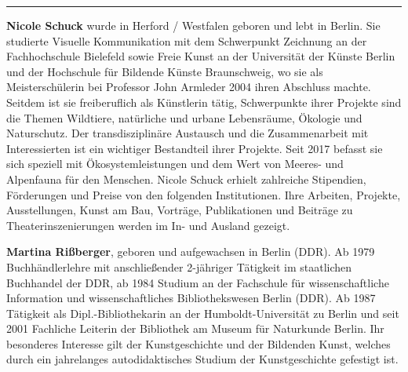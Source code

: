 \begin{center}\rule{0.5\linewidth}{0.5pt}\end{center}

\textbf{Nicole Schuck} wurde in Herford / Westfalen geboren und lebt in Berlin. Sie
studierte Visuelle Kommunikation mit dem Schwerpunkt Zeichnung an der
Fachhochschule Bielefeld sowie Freie Kunst an der Universität der Künste
Berlin und der Hochschule für Bildende Künste Braunschweig, wo sie als
Meisterschülerin bei Professor John Armleder 2004 ihren Abschluss
machte. Seitdem ist sie freiberuflich als Künstlerin tätig, Schwerpunkte
ihrer Projekte sind die Themen Wildtiere, natürliche und urbane
Lebensräume, Ökologie und Naturschutz. Der transdisziplinäre Austausch
und die Zusammenarbeit mit Interessierten ist ein wichtiger Bestandteil
ihrer Projekte. Seit 2017 befasst sie sich speziell mit
Ökosystemleistungen und dem Wert von Meeres- und Alpenfauna für den
Menschen. Nicole Schuck erhielt zahlreiche Stipendien, Förderungen und
Preise von den folgenden Institutionen. Ihre Arbeiten, Projekte,
Ausstellungen, Kunst am Bau, Vorträge, Publikationen und Beiträge zu
Theaterinszenierungen werden im In- und Ausland gezeigt.

\textbf{Martina Rißberger}, geboren und aufgewachsen in Berlin (DDR). Ab 1979
Buchhändlerlehre mit anschließender 2-jähriger Tätigkeit im staatlichen
Buchhandel der DDR, ab 1984 Studium an der Fachschule für
wissenschaftliche Information und wissenschaftliches Bibliothekswesen
Berlin (DDR). Ab 1987 Tätigkeit als Dipl.-Bibliothekarin an der
Humboldt-Universität zu Berlin und seit 2001 Fachliche Leiterin der
Bibliothek am Museum für Naturkunde Berlin. Ihr besonderes Interesse
gilt der Kunstgeschichte und der Bildenden Kunst, welches durch ein
jahrelanges autodidaktisches Studium der Kunstgeschichte gefestigt ist.
